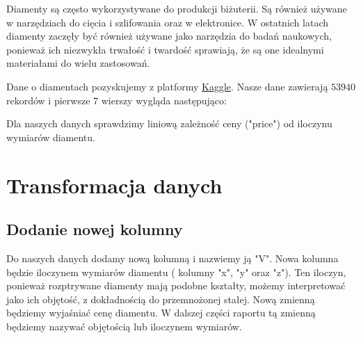\documentclass[12pt]{article}
\theoremstyle{exer}
\begin{document}
	Diamenty są często wykorzystywane do produkcji biżuterii. Są również używane  w  narzędziach do cięcia i szlifowania oraz w elektronice. W ostatnich latach diamenty zaczęły być również używane jako narzędzia do badań naukowych, ponieważ ich niezwykła trwałość i twardość sprawiają, że są one idealnymi materiałami do wielu zastosowań.
	
	Dane o diamentach pozyskujemy z platformy \href{https://www.kaggle.com}{Kaggle}. Nasze dane zawierają $53940$ rekordów i pierwsze $7$ wierszy wygląda następująco:
	\begin{table}[H]
		\caption{Oryginalne dane }
		\label{orginalne_dane}
	\end{table}
	
	Dla naszych danych sprawdzimy liniową zależność ceny ("price") od iloczynu wymiarów diamentu.
	\section{Transformacja danych}
	
	\subsection{Dodanie nowej kolumny }
	Do naszych danych dodamy nową kolumną i nazwiemy ją "V". Nowa kolumna będzie iloczynem wymiarów diamentu ( kolumny "x", "y" oraz "z"). Ten iloczyn, ponieważ rozptrywane diamenty mają podobne kształty, możemy interpretować jako ich objętość, z dokładnością do przemnożonej stałej. Nową zmienną będziemy wyjaśniać cenę diamentu. W dalszej części raportu tą zmienną będziemy nazywać objętością lub iloczynem wymiarów.
	
\end{document}
